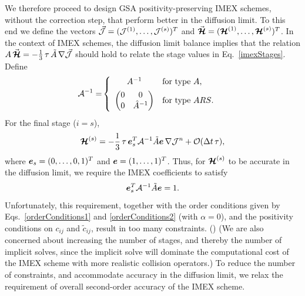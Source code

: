We therefore proceed to design GSA positivity-preserving IMEX schemes, without the correction step, that perform better in the diffusion limit.  
To this end we define the vectors $\vec{\mathcal{J}}=(\mathcal{J}^{(1)},\ldots,\mathcal{J}^{(s)})^{T}$ and $\vec{\boldsymbol{\mathcal{H}}}=(\boldsymbol{\mathcal{H}}^{(1)},\ldots,\boldsymbol{\mathcal{H}}^{(s)})^{T}$.  
In the context of IMEX schemes, the diffusion limit balance implies that the relation $A\,\vec{\boldsymbol{\mathcal{H}}}=-\frac{1}{3}\,\tau\,\tilde{A}\,\nabla\vec{\mathcal{J}}$ should hold to relate the stage values in Eq.~\eqref{imexStages}.  
Define
\begin{align*}
    \mathcal{A}^{-1}
    =&\left\{
      \begin{array}{cl}
       A^{-1} & \text{for type $A$,} \vspace{4pt} \\ 
       \left( 
          \begin{matrix} 
              0 & 0 \\ 
              0 & \hat{A}^{-1}
          \end{matrix}
       \right)  & \text{for type $ARS$.}
      \end{array}
      \right.
\end{align*}
For the final stage ($i=s$), 
\begin{equation}
  \boldsymbol{\mathcal{H}}^{(s)}=-\frac{1}{3}\,\tau\,\boldsymbol{e}_{s}^{T}\mathcal{A}^{-1}\tilde{A}\boldsymbol{e}\,\nabla\mathcal{J}^{n}+\mathcal{O}(\Delta t\,\tau),
\end{equation}
where $\boldsymbol{e}_{s}=(0,\ldots,0,1)^{T}$ and $\boldsymbol{e}=(1,\ldots,1)^{T}$.  
Thus, for $\boldsymbol{\mathcal{H}}^{(s)}$ to be accurate in the diffusion limit, we require the IMEX coefficients to satisfy
\begin{equation}
  \boldsymbol{e}_{s}^{T}\mathcal{A}^{-1}\tilde{A}\boldsymbol{e} = 1.
  \label{eq:diffusionCondition}
\end{equation}
Unfortunately, this requirement, together with the order conditions given by Eqs.~\eqref{orderConditions1} and \eqref{orderConditions2} (with $\alpha=0$), and the positivity conditions on $c_{ij}$ and $\tilde{c}_{ij}$, result in too many constraints.  
()
(We are also concerned about increasing the number of stages, and thereby the number of implicit solves, since the implicit solve will dominate the computational cost of the IMEX scheme with more realistic collision operators.)
To reduce the number of constraints, and accommodate accuracy in the diffusion limit, we relax the requirement of overall second-order accuracy of the IMEX scheme.  
